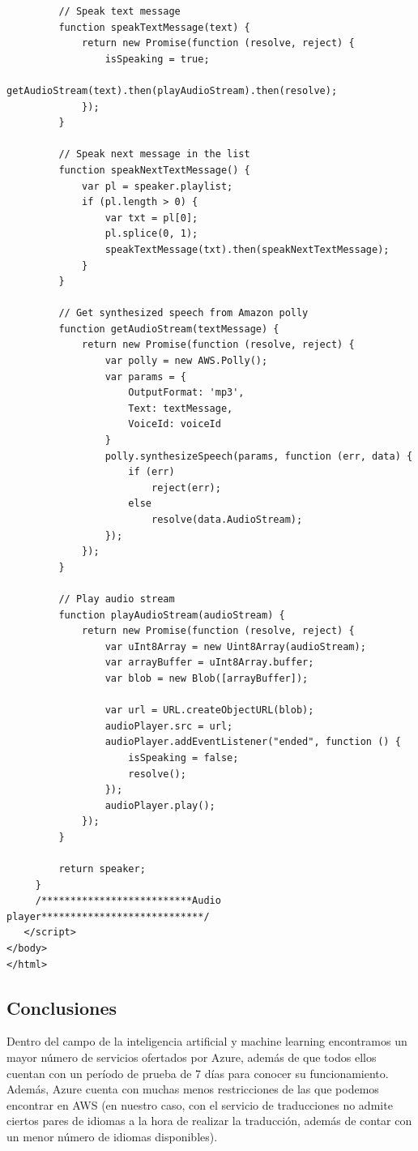 \documentclass[runningheads]{llncs}
\begin{document}
{\begin{verbatim}
         // Speak text message
         function speakTextMessage(text) {
             return new Promise(function (resolve, reject) {
                 isSpeaking = true;
                 getAudioStream(text).then(playAudioStream).then(resolve);
             });
         }

         // Speak next message in the list
         function speakNextTextMessage() {
             var pl = speaker.playlist;
             if (pl.length > 0) {
                 var txt = pl[0];
                 pl.splice(0, 1);
                 speakTextMessage(txt).then(speakNextTextMessage);
             }
         }

         // Get synthesized speech from Amazon polly
         function getAudioStream(textMessage) {
             return new Promise(function (resolve, reject) {
                 var polly = new AWS.Polly();
                 var params = {
                     OutputFormat: 'mp3',
                     Text: textMessage,
                     VoiceId: voiceId
                 }
                 polly.synthesizeSpeech(params, function (err, data) {
                     if (err)
                         reject(err);
                     else
                         resolve(data.AudioStream);
                 });
             });
         }

         // Play audio stream
         function playAudioStream(audioStream) {
             return new Promise(function (resolve, reject) {
                 var uInt8Array = new Uint8Array(audioStream);
                 var arrayBuffer = uInt8Array.buffer;
                 var blob = new Blob([arrayBuffer]);

                 var url = URL.createObjectURL(blob);
                 audioPlayer.src = url;
                 audioPlayer.addEventListener("ended", function () {
                     isSpeaking = false;
                     resolve();
                 });
                 audioPlayer.play();
             });
         }

         return speaker;
     }
     /**************************Audio player****************************/
   </script>
</body>
</html>

\end{verbatim}
}

\subsection{Conclusiones}
Dentro del campo de la inteligencia artificial y machine learning encontramos un mayor número de servicios ofertados por Azure, además de que todos ellos cuentan con un período de prueba de 7 días para conocer su funcionamiento. Además, Azure cuenta con muchas menos restricciones de las que podemos encontrar en AWS (en nuestro caso, con el servicio de traducciones no admite ciertos pares de idiomas a la hora de realizar la traducción, además de contar con un menor número de idiomas disponibles).
\end{document}
